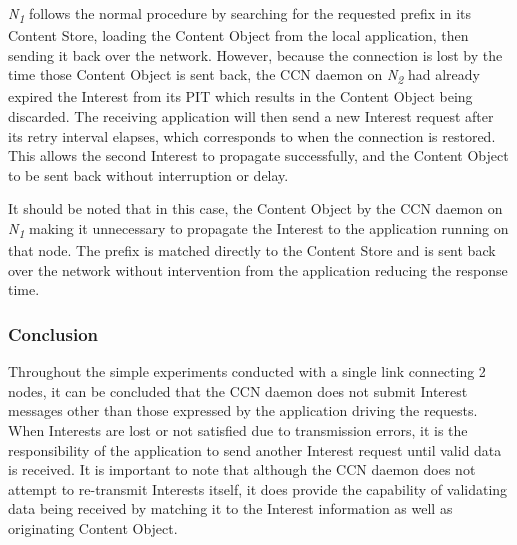 \documentclass[a4paper,12pt]{report}      %
\begin{document}
 \emph{N\textsubscript{1}} follows the normal procedure by searching for the requested prefix in its Content
Store, loading the Content Object from the local application, then sending it back over the network.
However, because the connection is lost by the time those Content Object is sent back, the CCN
daemon on  \emph{N\textsubscript{2}} had already expired the Interest from its PIT which results in the Content
Object being discarded. The receiving application will then send a new Interest request after its retry
interval elapses, which corresponds to when the connection is restored. This allows the second Interest
to propagate successfully, and the Content Object to be sent back without interruption or delay.

It should be noted that in this case, the Content Object by the CCN daemon on \emph{N\textsubscript{1}}  making
it unnecessary to propagate the Interest to the application running on that node. The prefix is matched
directly to the Content Store and is sent back over the network without intervention from the
application reducing the response time.


\subsubsection{Conclusion}

Throughout the simple experiments conducted with a single link connecting 2 nodes, it can be
concluded that the CCN daemon does not submit Interest messages other than those expressed by the
application driving the requests. When Interests are lost or not satisfied due to transmission errors, it is
the responsibility of the application to send another Interest request until valid data is received. It is
important to note that although the CCN daemon does not attempt to re-transmit Interests itself, it does
provide the capability of validating data being received by matching it to the Interest information as
well as originating Content Object.
\end{document}
